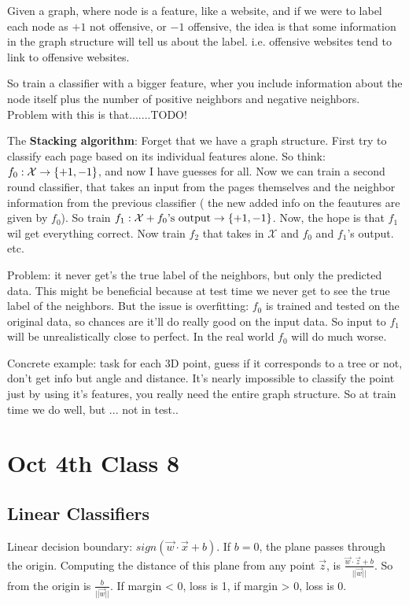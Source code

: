 Given a graph, where node is a feature, like a website, and if we were
to label each node as $+1$ not offensive, or $-1$ offensive, the idea
is that some information in the graph structure will tell us about the
label. i.e. offensive websites tend to link to offensive websites.

So train a classifier with a bigger feature, wher you include
information about the node itself plus the number of positive
neighbors and negative neighbors. Problem with this is that.......TODO!

The \textbf{Stacking algorithm}: Forget that we have a graph structure. First try
to classify each page based on its individual features alone. So
think: $f_0:\mathcal{X}\rightarrow \{+1, -1\}$, and now I have guesses for
all.
Now we can train a second round classifier, that takes an input from
the pages themselves and the neighbor information from the previous
classifier ( the new added info on the feautures are given by
$f_0$). So train $f_1:\mathcal{X}+f_0\text{'s output}\rightarrow
\{+1,-1\}$. Now, the hope is that $f_1$ wil get everything correct.
Now train $f_2$ that takes in $\mathcal{X}$ and $f_0$ and $f_1$'s
output. etc.

Problem: it never get's the true label of the neighbors, but only the
predicted data. This might be beneficial because at test time we never get to see
the true label of the neighbors. But the issue is overfitting: $f_0$
is trained and tested on the original data, so chances are it'll do
really good on the input data. So input to $f_1$ will be
unrealistically close to perfect. In the real world $f_0$ will do much
worse.

Concrete example: task for each 3D point, guess if it corresponds to a
tree or not, don't get info but angle and distance. It's nearly
impossible to classify the point just by using it's features, you
really need the entire graph structure. So at train time we do well,
but ... not in test..
\pagebreak
\section{Oct 4th Class 8}
\label{sec:class8}

\subsection{Linear Classifiers}
\label{sec:linear}

Linear decision boundary: $sign(\vec w \cdot \vec x + b)$. If $b=0$,
the plane passes through the origin. Computing the distance of this
plane from any point $\vec z$, is $\frac{\vec w \cdot \vec z +
  b}{||\vec w||}$.
 So from the origin is $\frac{b}{||\vec w||}$. If margin < 0,
loss is 1, if margin > 0, loss is 0.

